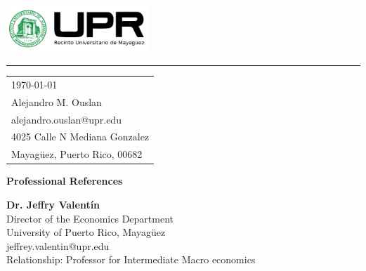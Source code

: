 \documentclass{article}
\begin{document}

\includegraphics[width=0.4\textwidth]{../assets/logo.png} %

\vspace{-1em} %

\rule{\linewidth}{1pt} %

\bigskip\bigskip %


\hfill
\begin{tabular}{l @{}}
\hfill \today \bigskip\\
\hfill Alejandro M. Ouslan \\
\hfill alejandro.ouslan@upr.edu \\
\hfill 4025 Calle N Mediana Gonzalez\\
\hfill Mayagüez, Puerto Rico, 00682 \\
\end{tabular}

\bigskip
\bigskip


\begin{center}
    {\LARGE \textbf{Professional References}}\\
\end{center}

\vspace{1.5em}


\textbf{Dr. Jeffry Valentín} \\
Director of the Economics Department \\
University of Puerto Rico, Mayagüez \\
jeffrey.valentin@upr.edu \\
Relationship: Professor for Intermediate Macro economics
\end{document}
